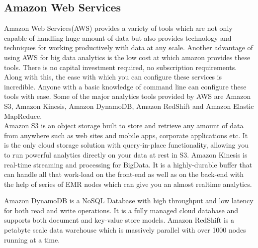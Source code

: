 \documentclass[sigconf]{acmart}
\begin{document}
\subsection{Amazon Web Services}
Amazon Web Services(AWS) provides a variety of tools which are not only capable of handling huge amount of data but also provides technology and techniques for working productively with data at any scale. Another advantage of using AWS for big data analytics is the low cost at which amazon provides these tools. There is no capital investment required, no subscription requirements. Along with this, the ease with which you can configure these services is incredible. Anyone with a basic knowledge of command line can configure these tools with ease. Some of the major analytics tools provided by AWS are Amazon S3, Amazon Kinesis, Amazon DynamoDB, Amazon RedShift and Amazon Elastic MapReduce.  \\
Amazon S3 is an object storage built to store and retrieve any amount of data from anywhere such as web sites and mobile apps, corporate applications etc. It is the only cloud storage solution with query-in-place functionality, allowing you to run powerful analytics directly on your data at rest in S3.\cite{S3}
Amazon Kinesis is real-time streaming and processing for BigData. It is a highly-durable buffer that can handle all that work-load on the front-end as well as on the back-end with the help of series of EMR nodes which can give you an almost realtime analytics.\cite{kinesis}

Amazon DynamoDB is a NoSQL Database with high throughput and low latency for both read and write operations. It is a fully managed cloud database and supports both document and key-value store models. 
Amazon RedShift is a petabyte scale data warehouse which is massively parallel with over 1000 nodes running at a time.
\end{document}
